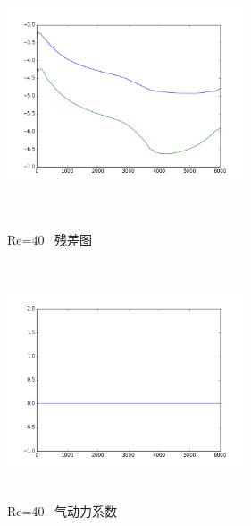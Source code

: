 \documentclass[UTF8]{ctexart}
\begin{document}
\begin{figure}[htbp]
\begin{minipage}{7cm}
\includegraphics[height=7cm,width=7cm]{../pic/Residue_40.png}
\caption{Re=40 \ 残差图}
\end{minipage}
\begin{minipage}{7cm}
\includegraphics[height=7cm,width=7cm]{../pic/Aerodynamics_40.png}
\caption{Re=40 \ 气动力系数}
\end{minipage}
\end{figure}
\clearpage
\end{document}
